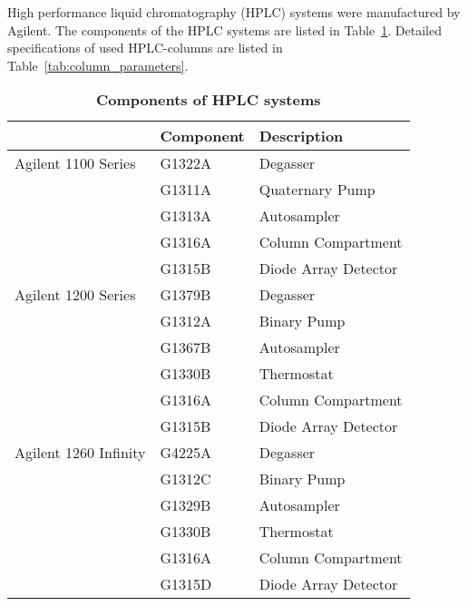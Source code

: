 
	High performance liquid chromatography (HPLC) systems were manufactured by Agilent. The components of the HPLC systems are listed in Table~\ref{tab:HPLCtab}. Detailed specifications of used HPLC-columns are listed in Table~\ref{tab:column_parameters}.

	\begin{table}[htbp]
		\caption[Components of HPLC systems]{\textbf{Components of HPLC systems}}
		\label{tab:HPLCtab}
		\centering
		\begin{tabularx}{\textwidth}{XXX}
			\toprule
							& \textbf{Component}		& \textbf{Description}	\\
			\midrule
			Agilent 1100 Series		&	G1322A		&	Degasser			\\
									&	G1311A		&	Quaternary Pump		\\
									&	G1313A		&	Autosampler			\\
									&	G1316A		&	Column Compartment	\\
									&	G1315B		&	Diode Array Detector	\\
			\midrule
			Agilent 1200 Series		&	G1379B		&	Degasser			\\
									&	G1312A		&	Binary Pump			\\
									&	G1367B		&	Autosampler			\\
									&	G1330B		&	Thermostat			\\
									&	G1316A		&	Column Compartment	\\
									&	G1315B		&	Diode Array Detector	\\
			\midrule
			Agilent 1260 Infinity	&	G4225A		&	Degasser			\\
									&	G1312C		&	Binary Pump			\\
									&	G1329B		&	Autosampler			\\
									&	G1330B		&	Thermostat			\\
									&	G1316A		&	Column Compartment	\\
									&	G1315D		&	Diode Array Detector	\\
			\bottomrule
		\end{tabularx}
	\end{table}

